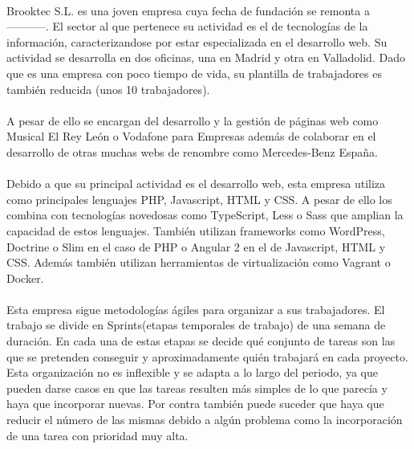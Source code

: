 \documentclass[10pt, a4paper,spanish]{article}
\begin{document}
        \paragraph{}
        Brooktec S.L. es una joven empresa cuya fecha de fundación se remonta a -----------. El sector al que pertenece su actividad es el de tecnologías de la información, caracterizandose por estar especializada en el desarrollo web. Su actividad se desarrolla en dos oficinas, una en Madrid y otra en Valladolid. Dado que es una empresa con poco tiempo de vida, su plantilla de trabajadores es también reducida (unos 10 trabajadores).

        \paragraph{}
        A pesar de ello se encargan del desarrollo y la gestión de páginas web como Musical El Rey León o Vodafone para Empresas además de colaborar en el desarrollo de otras muchas webs de renombre como Mercedes-Benz España.

        \paragraph{}
        Debido a que su principal actividad es el desarrollo web, esta empresa utiliza como principales lenguajes PHP, Javascript, HTML y CSS. A pesar de ello los combina con tecnologías novedosas como TypeScript, Less o Sass que amplian la capacidad de estos lenguajes. También utilizan frameworks como WordPress, Doctrine o Slim en el caso de PHP o Angular 2 en el de Javascript, HTML y CSS. Además también utilizan herramientas de virtualización como Vagrant o Docker.

        \paragraph{}
        Esta empresa sigue metodologías ágiles para organizar a sus trabajadores. El trabajo se divide en Sprints(etapas temporales de trabajo) de una semana de duración. En cada una de estas etapas se decide qué conjunto de tareas son las que se pretenden conseguir y aproximadamente quién trabajará en cada proyecto. Esta organización no es inflexible y se adapta a lo largo del periodo, ya que pueden darse casos en que las tareas resulten más simples de lo que parecía y haya que incorporar nuevas. Por contra también puede suceder que haya que reducir el número de las mismas debido a algún problema como la incorporación de una tarea con prioridad muy alta. 
\end{document}
